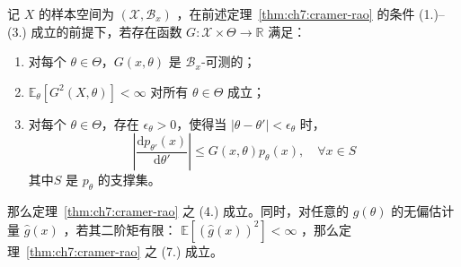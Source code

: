 \begin{lemma}
\label{lem:ch7:cramer-rao-regularity}

记 $X$ 的样本空间为 $(\mathscr X,\mathscr B_x)$ ，在前述定理~\ref{thm:ch7:cramer-rao} 的条件 (1.)--(3.) 成立的前提下，若存在函数 $G: \mathscr{X} \times \Theta \to \mathbb{R}$ 满足：

\begin{enumerate}
\def\labelenumi{\arabic{enumi}.}
\tightlist
\item
  对每个 $\theta \in \Theta$，$G(x, \theta)$ 是 $\mathscr B_x$‑可测的；
\item
  $\mathbb{E}_\theta [G^2(X, \theta)] < \infty$ 对所有 $\theta \in \Theta$ 成立；
\item
  对每个 $\theta \in \Theta$，存在 $\epsilon_\theta > 0$，使得当 $|\theta - \theta'| < \epsilon_\theta$ 时， \[ \left|\frac{\mathrm d p_{\theta'}(x)}{\mathrm d\theta'}\right| \le G(x, \theta) p_\theta(x), \quad \forall x \in S \]其中$S$ 是 $p_\theta$ 的支撑集。
\end{enumerate}

那么定理~\ref{thm:ch7:cramer-rao} 之 (4.) 成立。同时，对任意的 $g(\theta)$ 的无偏估计量 $\widehat g(x)$ ，若其二阶矩有限： $\mathbb{E}[(\widehat g(x))^2]<\infty$ ，那么定理~\ref{thm:ch7:cramer-rao} 之 (7.) 成立。

\end{lemma}

